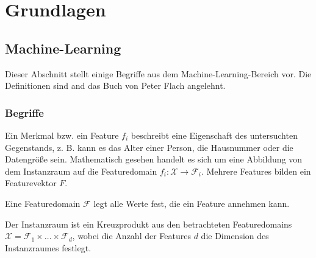 
\newpage

\section{Grundlagen}
\textit{}

\subsection{Machine-Learning}
Dieser Abschnitt stellt einige Begriffe aus dem Machine-Learning-Bereich vor. 
Die Definitionen sind and das Buch von Peter Flach \cite{Flach:2012:MLA:2490546} angelehnt.
\subsubsection{Begriffe}

\begin{term}
Ein Merkmal bzw. ein Feature $f_i$ beschreibt eine Eigenschaft des untersuchten Gegenstands, z. B. kann es das Alter einer Person, die Hausnummer oder die Datengröße sein. 
Mathematisch gesehen handelt es sich um eine Abbildung von dem Instanzraum auf die Featuredomain $f_i : \mathscr{X} \rightarrow \mathscr{F}_i$. 
Mehrere Features bilden ein Featurevektor $F$. 
\end{term}

\begin{term}[Featuredomain]
	Eine Featuredomain $\mathscr{F}$ legt alle Werte fest, die ein Feature annehmen kann. 
\end{term}

\begin{term}[Instanzraum]
Der Instanzraum ist ein Kreuzprodukt aus den betrachteten Featuredomains $\mathscr{X} = \mathscr{F}_1 \times \dots \times \mathscr{F}_d$, wobei die Anzahl der Features $d$ die Dimension des Instanzraumes festlegt.
\end{term}


